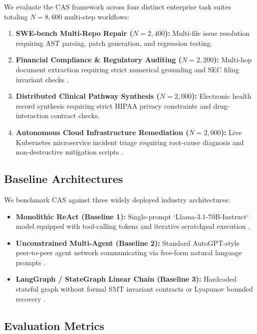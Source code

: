 \documentclass[10pt,twocolumn,letterpaper]{article}
\begin{document}
We evaluate the CAS framework across four distinct enterprise task suites totaling $N = 8,600$ multi-step workflows:
\begin{enumerate}
  \item \textbf{SWE-bench Multi-Repo Repair ($N = 2,400$):} Multi-file issue resolution requiring AST parsing, patch generation, and regression testing.
  \item \textbf{Financial Compliance \& Regulatory Auditing ($N = 2,200$):} Multi-hop document extraction requiring strict numerical grounding and SEC filing invariant checks \cite{arxiv_2501_02497}.
  \item \textbf{Distributed Clinical Pathway Synthesis ($N = 2,000$):} Electronic health record synthesis requiring strict HIPAA privacy constraints and drug-interaction contract checks.
  \item \textbf{Autonomous Cloud Infrastructure Remediation ($N = 2,000$):} Live Kubernetes microservice incident triage requiring root-cause diagnosis and non-destructive mitigation scripts \cite{arxiv_2406_00584}.
\end{enumerate}


\subsection{Baseline Architectures}


We benchmark CAS against three widely deployed industry architectures:
\begin{itemize}
  \item \textbf{Monolithic ReAct (Baseline 1):} Single-prompt `Llama-3.1-70B-Instruct` model equipped with tool-calling tokens and iterative scratchpad execution \cite{arxiv_2203_02155}.
  \item \textbf{Unconstrained Multi-Agent (Baseline 2):} Standard AutoGPT-style peer-to-peer agent network communicating via free-form natural language prompts \cite{arxiv_2412_06333}.
  \item \textbf{LangGraph / StateGraph Linear Chain (Baseline 3):} Hardcoded stateful graph without formal SMT invariant contracts or Lyapunov bounded recovery \cite{arxiv_2404_01131}.
\end{itemize}


\subsection{Evaluation Metrics}
\end{document}
